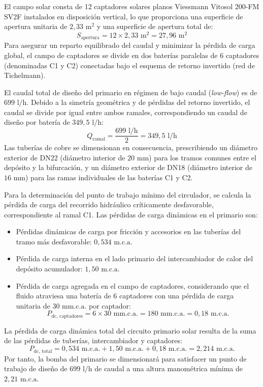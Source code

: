 \documentclass[12pt]{article}
\begin{document}
El campo solar consta de 12 captadores solares planos Viessmann Vitosol 200-FM SV2F instalados en disposición vertical, lo que proporciona una superficie de apertura unitaria de $2,33\text{ m}^2$ y una superficie de apertura total de:
\begin{equation}
    S_{\text{apertura}} = 12 \times 2,33\text{ m}^2 = 27,96\text{ m}^2
\end{equation}
Para asegurar un reparto equilibrado del caudal y minimizar la pérdida de carga global, el campo de captadores se divide en dos baterías paralelas de 6 captadores (denominadas C1 y C2) conectadas bajo el esquema de retorno invertido (red de Tichelmann). 

El caudal total de diseño del primario en régimen de bajo caudal (\textit{low-flow}) es de $699\text{ l/h}$. Debido a la simetría geométrica y de pérdidas del retorno invertido, el caudal se divide por igual entre ambos ramales, correspondiendo un caudal de diseño por batería de $349,5\text{ l/h}$:
\begin{equation}
    Q_{\text{ramal}} = \frac{699\text{ l/h}}{2} = 349,5\text{ l/h}
\end{equation}
Las tuberías de cobre se dimensionan en consecuencia, prescribiendo un diámetro exterior de DN22 (diámetro interior de $20\text{ mm}$) para los tramos comunes entre el depósito y la bifurcación, y un diámetro exterior de DN18 (diámetro interior de $16\text{ mm}$) para las ramas individuales de las baterías C1 y C2.

Para la determinación del punto de trabajo mínimo del circulador, se calcula la pérdida de carga del recorrido hidráulico críticamente desfavorable, correspondiente al ramal C1. Las pérdidas de carga dinámicas en el primario son:
\begin{itemize}
    \item Pérdidas dinámicas de carga por fricción y accesorios en las tuberías del tramo más desfavorable: $0,534\text{ m.c.a.}$
    \item Pérdida de carga interna en el lado primario del intercambiador de calor del depósito acumulador: $1,50\text{ m.c.a.}$
    \item Pérdida de carga agregada en el campo de captadores, considerando que el fluido atraviesa una batería de 6 captadores con una pérdida de carga unitaria de $30\text{ mm.c.a.}$ por captador:
    \begin{equation}
        P_{\text{dc, captadores}} = 6 \times 30\text{ mm.c.a.} = 180\text{ mm.c.a.} = 0,18\text{ m.c.a.}
    \end{equation}
\end{itemize}
La pérdida de carga dinámica total del circuito primario solar resulta de la suma de las pérdidas de tuberías, intercambiador y captadores:
\begin{equation}
    P_{\text{dc, total}} = 0,534\text{ m.c.a.} + 1,50\text{ m.c.a.} + 0,18\text{ m.c.a.} = 2,214\text{ m.c.a.}
\end{equation}
Por tanto, la bomba del primario se dimensionará para satisfacer un punto de trabajo de diseño de $699\text{ l/h}$ de caudal a una altura manométrica mínima de $2,21\text{ m.c.a.}$
\end{document}
